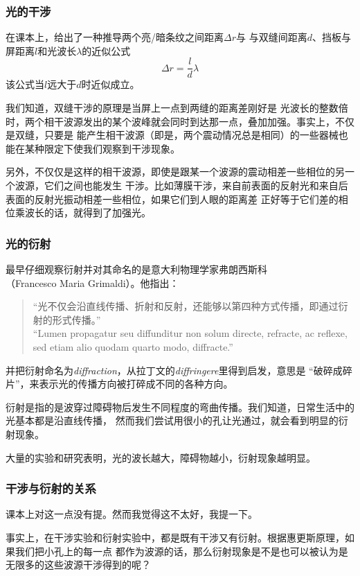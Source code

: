 \subsubsection{光的干涉}
在课本上，给出了一种推导两个亮/暗条纹之间距离$\Delta r$与
与双缝间距离$d$、挡板与屏距离$l$和光波长$\lambda$的近似公式
\begin{equation}
\Delta r = \frac{l}{d}\lambda
\end{equation}
该公式当$l$远大于$d$时近似成立。

我们知道，双缝干涉的原理是当屏上一点到两缝的距离差刚好是
光波长的整数倍时，两个相干波源发出的某个波峰就会同时到达那一点，叠加加强。事实上，不仅是双缝，只要是
能产生相干波源（即是，两个震动情况总是相同）的一些器械也能在某种限定下使我们观察到干涉现象。

另外，不仅仅是这样的相干波源，即使是跟某一个波源的震动相差一些相位的另一个波源，它们之间也能发生
干涉。比如薄膜干涉，来自前表面的反射光和来自后表面的反射光振动相差一些相位，如果它们到人眼的距离差
正好等于它们差的相位乘波长的话，就得到了加强光。

\subsubsection{光的衍射}
最早仔细观察衍射并对其命名的是意大利物理学家弗朗西斯科\\
（Francesco Maria Grimaldi）。他指出：
\begin{quote}
``光不仅会沿直线传播、折射和反射，还能够以第四种方式传播，即通过衍射的形式传播。''\\
``Lumen propagatur seu diffunditur non solum directe, refracte, ac 
reflexe, sed etiam alio quodam quarto modo, diffracte.''
\end{quote}
并把衍射命名为\emph{diffraction}，从拉丁文的\emph{diffringere}里得到启发，意思是
``破碎成碎片''，来表示光的传播方向被打碎成不同的各种方向。

衍射是指的是波穿过障碍物后发生不同程度的弯曲传播。我们知道，日常生活中的光基本都是沿直线传播，
然而我们尝试用很小的孔让光通过，就会看到明显的衍射现象。

大量的实验和研究表明，光的波长越大，障碍物越小，衍射现象越明显。

\subsubsection{干涉与衍射的关系}
课本上对这一点没有提。然而我觉得这不太好，我提一下。

事实上，在干涉实验和衍射实验中，都是既有干涉又有衍射。根据惠更斯原理，如果我们把小孔上的每一点
都作为波源的话，那么衍射现象是不是也可以被认为是无限多的这些波源干涉得到的呢？

